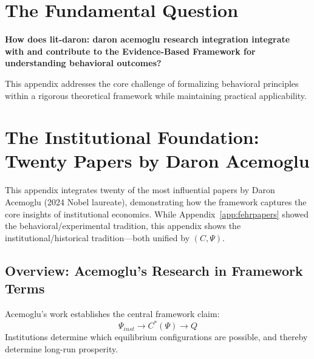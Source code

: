 \section{The Fundamental Question}
\label{sec:ace-fundamental}

\begin{tcolorbox}[
    colback=red!5!white,
    colframe=red!75!black,
    title={\textbf{Fundamental Question}}
]
\textbf{How does lit-daron: daron acemoglu research integration integrate with and contribute to the
Evidence-Based Framework for understanding behavioral outcomes?}

This appendix addresses the core challenge of formalizing behavioral principles
within a rigorous theoretical framework while maintaining practical applicability.
\end{tcolorbox}




\section{The Institutional Foundation: Twenty Papers by Daron Acemoglu}
\label{app:acemoglu}

This appendix integrates twenty of the most influential papers by Daron Acemoglu
(2024 Nobel laureate), demonstrating how the framework captures the core
insights of institutional economics. While Appendix~\ref{app:fehrpapers}
showed the behavioral/experimental tradition, this appendix shows the
institutional/historical tradition---both unified by $(C, \Psi)$.

\subsection{Overview: Acemoglu's Research in Framework Terms}

Acemoglu's work establishes the central framework claim:
\begin{equation}
  \Psi_{inst} \to C^*(\Psi) \to Q
\end{equation}
Institutions determine which equilibrium configurations are possible,
and thereby determine long-run prosperity.

